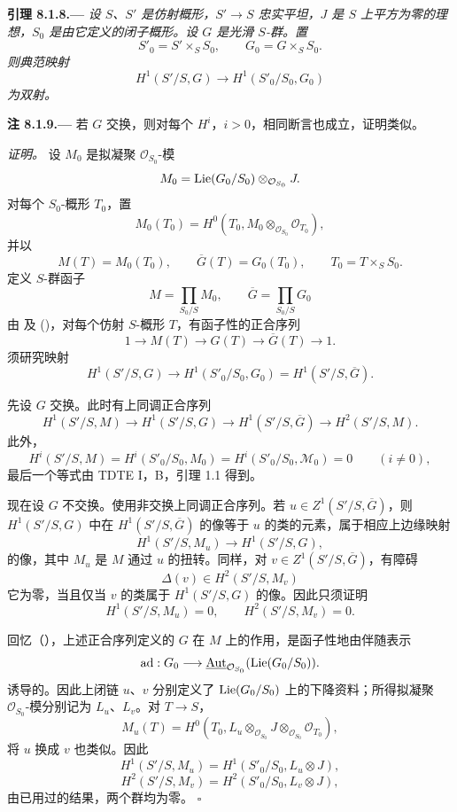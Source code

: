 \par\medskip\noindent{}\textbf{引理 8.1.8.---}\enspace
\emph{设 \(S\)、\(S'\) 是仿射概形，\(S'\to S\) 忠实平坦，\(J\) 是 \(S\) 上平方为零的理想，\(S_0\) 是由它定义的闭子概形。设 \(G\) 是光滑 \(S\)-群。置
\[
  S'_0=S'\times_SS_0,
  \qquad
  G_0=G\times_SS_0.
\]
则典范映射
\[
  H^1(S'/S,G)\longrightarrow H^1(S'_0/S_0,G_0)
\]
为双射。}

\par\medskip\noindent{}\textbf{注 8.1.9.---}\enspace
若 \(G\) 交换，则对每个 \(H^i\)，\(i>0\)，相同断言也成立，证明类似。

\smallskip\noindent\emph{证明。}
设 \(M_0\) 是拟凝聚 \(\mathcal O_{S_0}\)-模
\[
  M_0
  =
  \operatorname{Lie}(G_0/S_0)\otimes_{\mathcal O_{S_0}}J.
\]
对每个 \(S_0\)-概形 \(T_0\)，置
\[
  M_0(T_0)
  =
  H^0\!\left(
    T_0,
    M_0\otimes_{\mathcal O_{S_0}}\mathcal O_{T_0}
  \right),
\]
并以
\[
  M(T)=M_0(T_0),
  \qquad
  \overline G(T)=G_0(T_0),
  \qquad
  T_0=T\times_SS_0.
\]
定义 \(S\)-群函子
\[
  M=\prod_{S_0/S}M_0,
  \qquad
  \overline G=\prod_{S_0/S}G_0
\]
由 及 ()，对每个仿射 \(S\)-概形 \(T\)，有函子性的正合序列
\[
  1\longrightarrow M(T)\longrightarrow G(T)
  \longrightarrow\overline G(T)\longrightarrow1.
\]
须研究映射
\[
  H^1(S'/S,G)
  \longrightarrow
  H^1(S'_0/S_0,G_0)
  =
  H^1(S'/S,\overline G).
\]

先设 \(G\) 交换。此时有上同调正合序列
\[
  H^1(S'/S,M)
  \longrightarrow H^1(S'/S,G)
  \longrightarrow H^1(S'/S,\overline G)
  \longrightarrow H^2(S'/S,M).
\]
此外，
\[
  H^i(S'/S,M)
  =
  H^i(S'_0/S_0,M_0)
  =
  H^i(S'_0/S_0,\mathcal M_0)
  =
  0
  \qquad(i\neq0),
\]
最后一个等式由 TDTE I，B，引理 1.1 得到。

现在设 \(G\) 不交换。使用非交换上同调正合序列。若 \(u\in Z^1(S'/S,\overline G)\)，则 \(H^1(S'/S,G)\) 中在 \(H^1(S'/S,\overline G)\) 的像等于 \(u\) 的类的元素，属于相应上边缘映射
\[
  H^1(S'/S,M_u)\longrightarrow H^1(S'/S,G),
\]
的像，其中 \(M_u\) 是 \(M\) 通过 \(u\) 的扭转。同样，对 \(v\in Z^1(S'/S,\overline G)\)，有障碍
\[
  \Delta(v)\in H^2(S'/S,M_v)
\]
它为零，当且仅当 \(v\) 的类属于 \(H^1(S'/S,G)\) 的像。因此只须证明
\[
  H^1(S'/S,M_u)=0,
  \qquad
  H^2(S'/S,M_v)=0.
\]

回忆（），上述正合序列定义的 \(G\) 在 \(M\) 上的作用，是函子性地由伴随表示
\[
  \operatorname{ad}:G_0
  \longrightarrow
  \underline{\operatorname{Aut}}_{\mathcal O_{S_0}}
    (\operatorname{Lie}(G_0/S_0)).
\]
诱导的。因此上闭链 \(u\)、\(v\) 分别定义了 \(\operatorname{Lie}(G_0/S_0)\) 上的下降资料；所得拟凝聚 \(\mathcal O_{S_0}\)-模分别记为 \(L_u\)、\(L_v\)。对 \(T\to S\)，
\[
  M_u(T)
  =
  H^0\!\left(
    T_0,
    L_u\otimes_{\mathcal O_{S_0}}J
      \otimes_{\mathcal O_{S_0}}\mathcal O_{T_0}
  \right),
\]
将 \(u\) 换成 \(v\) 也类似。因此
\[
  H^1(S'/S,M_u)=H^1(S'_0/S_0,L_u\otimes J),
\]
\[
  H^2(S'/S,M_v)=H^2(S'_0/S_0,L_v\otimes J),
\]
由已用过的结果，两个群均为零。
\hfill\(\square\)

